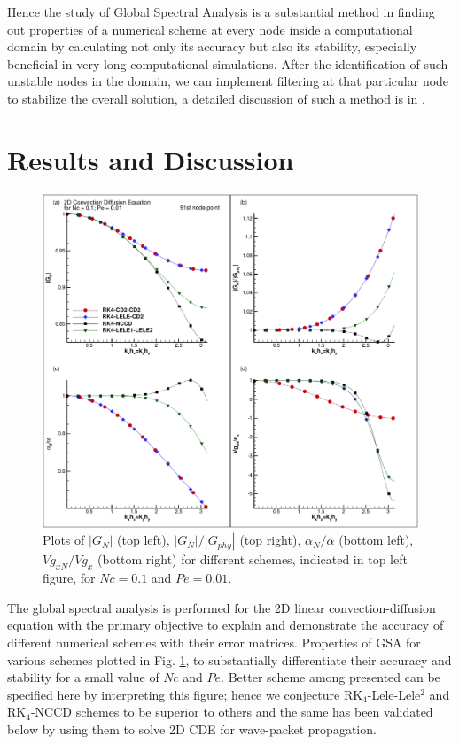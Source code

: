 \documentclass[showpacs,preprintnumbers,amsmath,amssymb]{revtex4-1} %
\begin{document}
Hence the study of Global Spectral Analysis is a substantial method in finding out properties of a numerical scheme at every node inside a computational domain by calculating not only its accuracy but also its stability, especially beneficial in very long computational simulations. After the identification of such unstable nodes in the domain, we can implement filtering \cite{sengupta2013high} at that particular node to stabilize the overall solution, a detailed discussion of such a method is in \cite{SENGUPTA_et_al_10}.

\section{Results and Discussion}

\begin{figure}[h]
\begin{center}
\includegraphics[width=150mm]{all_schemes.pdf}
\end{center}    
\raggedleft
\caption{Plots of $|G_N|$ (top left), $|G_N|/|G_{phy}|$ (top right), $\alpha_N/\alpha$ (bottom left), $Vg_{xN}/Vg_x$ (bottom right) for different schemes, indicated in top left figure, for $Nc=0.1$ and $Pe=0.01$.}
\label{fig_all}
\end{figure}

The global spectral analysis is performed for the 2D linear convection-diffusion equation with the primary objective to explain and demonstrate the accuracy of different numerical schemes with their error matrices. Properties of GSA for various schemes plotted in Fig. \ref{fig_all}, to substantially differentiate their accuracy and stability for a small value of $Nc$ and $Pe$. Better scheme among presented can be specified here by interpreting this figure; hence we conjecture RK$_4$-Lele-Lele$^2$ and RK$_4$-NCCD schemes to be superior to others and the same has been validated below by using them to solve 2D CDE for wave-packet propagation.
\end{document}
